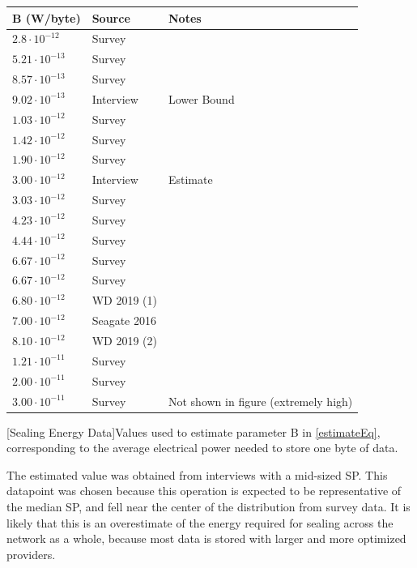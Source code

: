 \documentclass[9pt, oneside]{article}   	%
\begin{document}
\begin{multicols}{2}

\small
 \noindent \begin{tabular}{|| p{2cm} | p{2.5cm} | p{2.5cm} ||} 
 \hline
 \textbf{B (W/byte)} & \textbf{Source} & \textbf{Notes}\\
   \hline
 $2.8 \cdot 10^{-12}$ & Survey &  \\
  \hline
$5.21\cdot 10^{-13}$ & Survey &  \\
\hline
$8.57\cdot 10^{-13}$ & Survey &  \\
\hline
$9.02\cdot 10^{-13}$ & Interview & Lower Bound \\
\hline
$1.03\cdot 10^{-12}$ & Survey &  \\
\hline
$1.42\cdot 10^{-12}$ & Survey &  \\
\hline
$1.90\cdot 10^{-12}$ & Survey &  \\
\hline
$3.00\cdot 10^{-12}$ & Interview & Estimate \\
\hline
$3.03\cdot 10^{-12}$ & Survey &  \\
\hline
$4.23\cdot 10^{-12}$ & Survey &  \\
\hline
$4.44\cdot 10^{-12}$ & Survey &  \\
\hline
$6.67\cdot 10^{-12}$ & Survey &  \\
\hline
$6.67\cdot 10^{-12}$ & Survey &  \\
\hline
$6.80\cdot 10^{-12}$ & WD 2019 (1) &  \\
\hline
$7.00\cdot 10^{-12}$ & Seagate 2016 &  \\
\hline
$8.10\cdot 10^{-12}$ & WD 2019 (2) &  \\
\hline
$1.21\cdot 10^{-11}$ & Survey &  \\
\hline
$2.00\cdot 10^{-11}$ & Survey &  \\
\hline
$3.00\cdot 10^{-11}$ & Survey & Not shown in figure (extremely high) \\
\hline
 \end{tabular}
  [Sealing Energy Data]{Values used to estimate parameter B in \ref{estimateEq}, corresponding to the average electrical power needed to store one byte of data.}
\label{storageEnergyTable}
\normalsize{}

\indent{}

The estimated value was obtained from interviews with a mid-sized SP. This datapoint was chosen because this operation is expected to be representative of the median SP, and fell near the center of the distribution from survey data. It is likely that this is an overestimate of the energy required for sealing across the network as a whole, because most data is stored with larger and more optimized providers.


\end{multicols}
\end{document}

